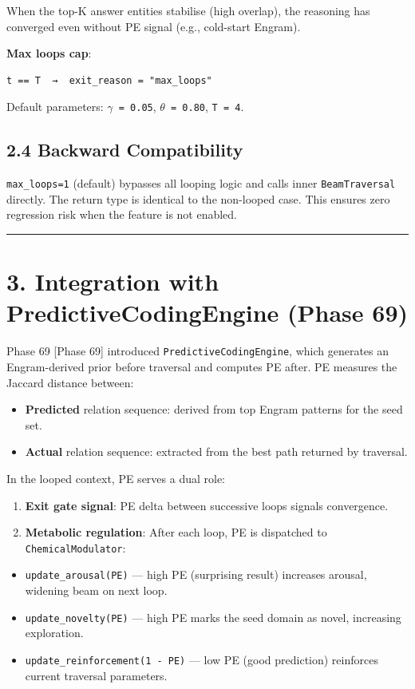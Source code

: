 When the top-K answer entities stabilise (high overlap), the reasoning has converged even without PE signal (e.g., cold-start Engram).

\textbf{Max loops cap}:
\begin{lstlisting}
t == T  →  exit_reason = "max_loops"
\end{lstlisting}

Default parameters: \texttt{$\gamma$ = 0.05}, \texttt{$\theta$ = 0.80}, \texttt{T = 4}.

\subsection*{2.4 Backward Compatibility}

\texttt{max\_loops=1} (default) bypasses all looping logic and calls inner \texttt{BeamTraversal} directly. The return type is identical to the non-looped case. This ensures zero regression risk when the feature is not enabled.

\medskip\noindent\rule{\linewidth}{0.4pt}\medskip

\section*{3. Integration with PredictiveCodingEngine (Phase 69)}

Phase 69 [Phase 69] introduced \texttt{PredictiveCodingEngine}, which generates an Engram-derived prior before traversal and computes PE after. PE measures the Jaccard distance between:
\begin{itemize}
  \item \textbf{Predicted} relation sequence: derived from top Engram patterns for the seed set.
  \item \textbf{Actual} relation sequence: extracted from the best path returned by traversal.
\end{itemize}


In the looped context, PE serves a dual role:

\begin{enumerate}
  \item \textbf{Exit gate signal}: PE delta between successive loops signals convergence.
  \item \textbf{Metabolic regulation}: After each loop, PE is dispatched to \texttt{ChemicalModulator}:
\end{enumerate}

\begin{itemize}
  \item \texttt{update\_arousal(PE)} --- high PE (surprising result) increases arousal, widening beam on next loop.
  \item \texttt{update\_novelty(PE)} --- high PE marks the seed domain as novel, increasing exploration.
  \item \texttt{update\_reinforcement(1 - PE)} --- low PE (good prediction) reinforces current traversal parameters.
\end{itemize}


